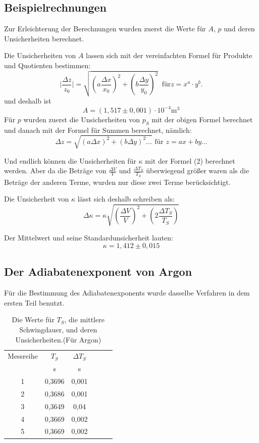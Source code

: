 \documentclass[11pt,a4paper]{article} %
\begin{document}
\begin{tcolorbox}[colback=white]
\subsection{Beispielrechnungen}
Zur Erleichterung der Berechnungen wurden zuerst die Werte für $A$, $p$ und deren Unsicherheiten berechnet. 

Die Unsicherheiten von $A$ lassen sich mit der vereinfachten Formel für Produkte und Quotienten bestimmen:
\begin{equation}
\vert\frac{\Delta z}{z_0}\vert = \sqrt{(a\frac{\Delta x}{x_0})^2+(b\frac{\Delta y}{y_0})^2} \; \; \textrm{für} z=x^a\cdot y^b. 
\end{equation}
und deshalb ist
$$ A = (1,517 \pm 0,001) \cdot 10^{-4} \textrm{m}^3$$
Für $p$ wurden zuerst die Unsicherheiten von $p_S$ mit der obigen Formel berechnet und danach mit der Formel für Summen berechnet, nämlich:
\begin{equation}
\Delta z = \sqrt{(a\Delta x)^2 + (b \Delta y)^2 ...} \textrm{  für } z = ax+by \dots
\end{equation}

Und endlich können die Unsicherheiten für $\kappa$ mit der Formel (2) berechnet werden. Aber da die Beträge von $\frac{\Delta V}{V}$ und $\frac{\Delta T_S}{T_S}$ überwiegend größer waren als die Beträge der anderen Terme, wurden nur diese zwei Terme berücksichtigt. 

Die Unsicherheit von $\kappa$ lässt sich deshalb schreiben als:
$$ \Delta \kappa  = \kappa \sqrt{(\frac{\Delta V}{V})^2 + (2\frac{\Delta T_S}{T_S})} $$
\end{tcolorbox}

Der Mittelwert und seine Standardunsicherheit lauten:
$$\kappa =  1,412 \pm 0,015$$

\subsection{Der Adiabatenexponent von Argon}

Für die Bestimmung des Adiabatenexponents wurde dasselbe Verfahren in dem ersten Teil benutzt. 

\begin{table} [h]
	\begin{tabular*}{0.99\textwidth}{@{\extracolsep{\fill}}cccccc}
		\toprule
		Messreihe & $T_S$ & $\Delta T_S$  \\
		& s & s   \\
		\bottomrule
		1 & 0,3696 & 0,001 \\
		2 & 0,3686 & 0,001 \\
		3 & 0,3649 &  0,04\\
		4 & 0,3669 & 0,002 \\
		5 & 0,3669  & 0,002 \\
		\bottomrule
	\end{tabular*}
	\caption{Die Werte für $T_S$, die mittlere Schwingdauer, und deren Unsicherheiten.(Für Argon)}
\end{table} 
\end{document}
